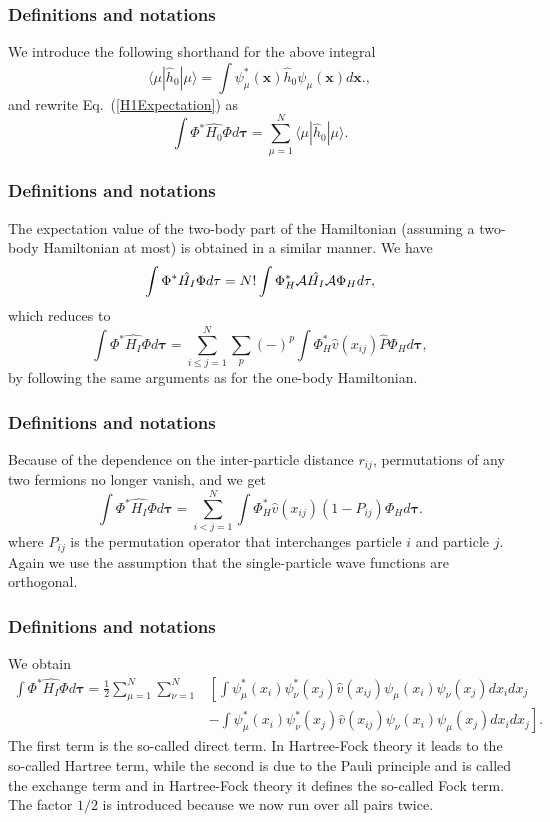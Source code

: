 \documentclass[compress]{beamer}
\begin{document}
\frame
{
  \frametitle{Definitions and notations}
\begin{small}
{\scriptsize
We introduce the following shorthand for the above integral
\[
\langle \mu | \hat{h}_0 | \mu \rangle = \int \psi_{\mu}^*(\mathbf{x})\hat{h}_0\psi_{\mu}(\mathbf{x})d\mathbf{x}.,
\]
and rewrite Eq.~(\ref{H1Expectation}) as
\begin{equation}
  \int \Phi^*\hat{H_0}\Phi  d\mathbf{\tau}
  = \sum_{\mu=1}^N \langle \mu | \hat{h}_0 | \mu \rangle.
  \label{H1Expectation1}
\end{equation}

}
\end{small}
}
\frame
{
  \frametitle{Definitions and notations}
\begin{small}
{\scriptsize
The expectation value of the two-body part of the Hamiltonian (assuming a two-body Hamiltonian at most) is obtained in a
similar manner. We have
\begin{equation*}
  \int \Phi^*\hat{H_I}\Phi d\mathbf{\tau} 
  = N! \int \Phi_H^*{\cal A}\hat{H_I}{\cal A}\Phi_H d\mathbf{\tau},
\end{equation*}
which reduces to
\begin{equation*}
 \int \Phi^*\hat{H_I}\Phi d\mathbf{\tau} 
  = \sum_{i\le j=1}^N \sum_{p} (-)^p\int 
  \Phi_H^*\hat{v}(x_{ij})\hat{P}\Phi_H d\mathbf{\tau},
\end{equation*}
by following the same arguments as for the one-body
Hamiltonian. 
}
\end{small}
}
\frame
{
  \frametitle{Definitions and notations}
\begin{small}
{\scriptsize
Because of the dependence on the inter-particle distance $r_{ij}$,  permutations of
any two fermions no longer vanish, and we get
\begin{equation*}
  \int \Phi^*\hat{H_I}\Phi d\mathbf{\tau} 
  = \sum_{i < j=1}^N \int  
  \Phi_H^*\hat{v}(x_{ij})(1-P_{ij})\Phi_H d\mathbf{\tau}.
\end{equation*}
where $P_{ij}$ is the permutation operator that interchanges
particle $i$ and particle $j$. Again we use the assumption that the single-particle wave functions
are orthogonal. 
}
\end{small}
}
\frame
{
  \frametitle{Definitions and notations}
\begin{small}
{\scriptsize
We obtain
\begin{equation}
\begin{split}
  \int \Phi^*\hat{H_I}\Phi d\mathbf{\tau} 
  = \frac{1}{2}\sum_{\mu=1}^N\sum_{\nu=1}^N
    &\left[ \int \psi_{\mu}^*(x_i)\psi_{\nu}^*(x_j)\hat{v}(x_{ij})\psi_{\mu}(x_i)\psi_{\nu}(x_j)
    dx_idx_j \right.\\
  &\left.
  - \int \psi_{\mu}^*(x_i)\psi_{\nu}^*(x_j)
  \hat{v}(x_{ij})\psi_{\nu}(x_i)\psi_{\mu}(x_j)
  dx_idx_j
  \right]. \label{H2Expectation}
\end{split}
\end{equation}
The first term is the so-called direct term. In Hartree-Fock theory it leads to the so-called Hartree term, 
while the second is due to the Pauli principle and is called
the exchange term and in Hartree-Fock theory it defines the so-called Fock term.
The factor  $1/2$ is introduced because we now run over
all pairs twice. 
}
\end{small}
}
\end{document}
